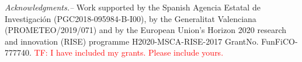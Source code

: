\documentclass[aps, twocolumn, superscriptaddress, showpacs, nofootinbib, longbibliography]{revtex4-1}
\newcommand{\tf}[1]{\textcolor{red}{TF: #1}}
\begin{document}
\begin{abstract}
  
\end{abstract}

\maketitle

\bigskip

\bigskip

\bigskip

\bigskip

\bigskip


\bigskip\noindent\textit{Acknowledgments.--} Work supported by the Spanish Agencia Estatal de Investigaci\'on (PGC2018-095984-B-I00), by the Generalitat Valenciana (PROMETEO/2019/071)
and by  the European Union’s Horizon 2020 research and innovation (RISE)  programme   H2020-MSCA-RISE-2017  GrantNo.  FunFiCO-777740.  \tf{I have included my grants. Please include yours.}

\begin{appendices}

\end{appendices}
%

\end{document}
